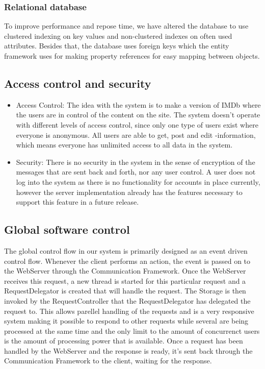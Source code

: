\subsubsection{Relational database}
To improve performance and repose time, we have altered the database to use clustered indexing on key values and non-clustered indexes on often used attributes. Besides that, the database uses foreign keys which the entity framework uses for making property references for easy mapping between objects. 


\subsection{Access control and security}
\begin{itemize}
\item Access Control: The idea with the system is to make a version of IMDb where the users are in control of the content on the site. The system doesn't operate with different levels of access control, since only one type of users exist where everyone is anonymous. All users are able to get, post and edit -information, which means everyone has unlimited access to all data in the system.\\
\item Security: There is no security in the system in the sense of encryption of the messages that are sent back and forth, nor any user control. A user does not log into the system as there is no functionality for accounts in place currently, however the server implementation already has the features necessary to support this feature in a future release.
\end{itemize}

\subsection{Global software control}
The global control flow in our system is primarily designed as an event driven control flow. Whenever the client performs an action, the event is passed on to the WebServer through the Communication Framework. Once the WebServer receives this request, a new thread is started for this particular request and a RequestDelegator is created that will handle the request. The Storage is then invoked by the RequestController that the RequestDelegator has delegated the request to. This allows parellel handling of the requests and is a very responsive system making it possible to respond to other requests while several are being processed at the same time and the only limit to the amount of concurrenct users is the amount of processing power that is available. Once a request has been handled by the WebServer and the response is ready, it's sent back through the Communication Framework to the client, waiting for the response. 

